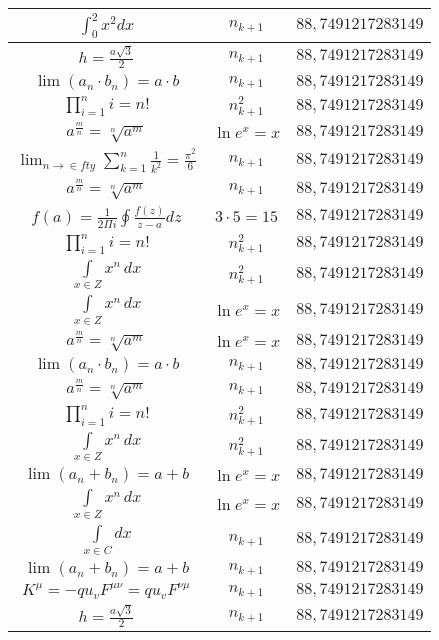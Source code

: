 \documentclass{article}
\begin{document}
\begin{flushleft}
\begin{longtable}{|c|c|c|}
$\int _0^2x^2dx$ & $n_{k+1}$ & $88,7491217283149$ \\ \hline 
$h=\frac{a\sqrt{3}}{2}$ & $n_{k+1}$ & $88,7491217283149$ \\ \hline 
$\lim\left(a_n\cdot b_n\right)=a\cdot b$ & $n_{k+1}$ & $88,7491217283149$ \\ \hline 
$\prod_{i=1}^ni=n!$ & $n_{k+1}^2$ & $88,7491217283149$ \\ \hline 
$a^{\frac{m}{n}}=\sqrt[n]{a^{m}}$ & $\ln e^x=x$ & $88,7491217283149$ \\ \hline 
$\lim_{n\to\in fty}\sum_{k=1}^n\frac{1}{k^2}=\frac{\pi^2}{6}$ & $n_{k+1}$ & $88,7491217283149$ \\ \hline 
$a^{\frac{m}{n}}=\sqrt[n]{a^{m}}$ & $n_{k+1}$ & $88,7491217283149$ \\ \hline 
$f\left(a\right)=\frac{1}{2\Pi i}\oint\frac{f\left(z\right)}{z-a}dz$ & $3\cdot 5=15$ & $88,7491217283149$ \\ \hline 
$\prod_{i=1}^ni=n!$ & $n_{k+1}^2$ & $88,7491217283149$ \\ \hline 
$\int \limits_{x\in Z}\!x^{n}\,dx$ & $n_{k+1}^2$ & $88,7491217283149$ \\ \hline 
$\int \limits_{x\in Z}\!x^{n}\,dx$ & $\ln e^x=x$ & $88,7491217283149$ \\ \hline 
$a^{\frac{m}{n}}=\sqrt[n]{a^{m}}$ & $\ln e^x=x$ & $88,7491217283149$ \\ \hline 
$\lim\left(a_n\cdot b_n\right)=a\cdot b$ & $n_{k+1}$ & $88,7491217283149$ \\ \hline 
$a^{\frac{m}{n}}=\sqrt[n]{a^{m}}$ & $n_{k+1}$ & $88,7491217283149$ \\ \hline 
$\prod_{i=1}^ni=n!$ & $n_{k+1}^2$ & $88,7491217283149$ \\ \hline 
$\int \limits_{x\in Z}\!x^{n}\,dx$ & $n_{k+1}^2$ & $88,7491217283149$ \\ \hline 
$\lim\left(a_n+b_n\right)=a+b$ & $\ln e^x=x$ & $88,7491217283149$ \\ \hline 
$\int \limits_{x\in Z}\!x^{n}\,dx$ & $\ln e^x=x$ & $88,7491217283149$ \\ \hline 
$\int \limits_{x\in C}dx$ & $n_{k+1}$ & $88,7491217283149$ \\ \hline 
$\lim\left(a_n+b_n\right)=a+b$ & $n_{k+1}$ & $88,7491217283149$ \\ \hline 
$K^\mu=-qu_vF^{\mu\nu}=qu_vF^{\nu\mu}$ & $n_{k+1}$ & $88,7491217283149$ \\ \hline 
$h=\frac{a\sqrt{3}}{2}$ & $n_{k+1}$ & $88,7491217283149$ \\ \hline 

\end{longtable}
\end{flushleft}
\end{document}
